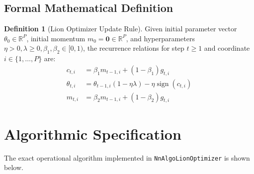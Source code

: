 \documentclass[11pt,a4paper]{article}
\theoremstyle{definition}
\newtheorem{definition}{Definition}[section]
\begin{document}
\subsection{Formal Mathematical Definition}
\begin{definition}[Lion Optimizer Update Rule]
Given initial parameter vector $\theta_0 \in \mathbb{R}^P$, initial momentum $m_0 = \mathbf{0} \in \mathbb{R}^P$, and hyperparameters $\eta > 0, \lambda \ge 0, \beta_1, \beta_2 \in [0, 1)$, the recurrence relations for step $t \ge 1$ and coordinate $i \in \{1, \dots, P\}$ are:
\begin{align}
c_{t, i} &= \beta_1 m_{t-1, i} + (1 - \beta_1) g_{t, i} \label{eq:lion_interp} \\
\theta_{t, i} &= \theta_{t-1, i} (1 - \eta \lambda) - \eta \operatorname{sign}(c_{t, i}) \label{eq:lion_update} \\
m_{t, i} &= \beta_2 m_{t-1, i} + (1 - \beta_2) g_{t, i} \label{eq:lion_buffer}
\end{align}
\end{definition}

\section{Algorithmic Specification}

The exact operational algorithm implemented in \texttt{NnAlgoLionOptimizer} is shown below.
\end{document}
